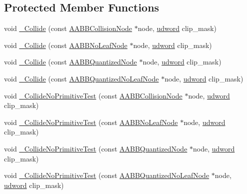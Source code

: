 \subsection*{Protected Member Functions}
\begin{DoxyCompactItemize}
\item 
void \hyperlink{class_planes_collider_afe02fe2d147e793bbeab7a9eb89bed2b}{\+\_\+\+Collide} (const \hyperlink{class_a_a_b_b_collision_node}{A\+A\+B\+B\+Collision\+Node} $\ast$node, \hyperlink{_ice_types_8h_a44c6f1920ba5551225fb534f9d1a1733}{udword} clip\+\_\+mask)
\item 
void \hyperlink{class_planes_collider_a2fe298e87efaba35deff6e4ad7a56da0}{\+\_\+\+Collide} (const \hyperlink{class_a_a_b_b_no_leaf_node}{A\+A\+B\+B\+No\+Leaf\+Node} $\ast$node, \hyperlink{_ice_types_8h_a44c6f1920ba5551225fb534f9d1a1733}{udword} clip\+\_\+mask)
\item 
void \hyperlink{class_planes_collider_a405bf739ddac7a191edee9a8e438bc8a}{\+\_\+\+Collide} (const \hyperlink{class_a_a_b_b_quantized_node}{A\+A\+B\+B\+Quantized\+Node} $\ast$node, \hyperlink{_ice_types_8h_a44c6f1920ba5551225fb534f9d1a1733}{udword} clip\+\_\+mask)
\item 
void \hyperlink{class_planes_collider_aface806a10833333a7e0473d7b30767b}{\+\_\+\+Collide} (const \hyperlink{class_a_a_b_b_quantized_no_leaf_node}{A\+A\+B\+B\+Quantized\+No\+Leaf\+Node} $\ast$node, \hyperlink{_ice_types_8h_a44c6f1920ba5551225fb534f9d1a1733}{udword} clip\+\_\+mask)
\item 
void \hyperlink{class_planes_collider_ac449d61fe5762a288103ec40c8bf72ce}{\+\_\+\+Collide\+No\+Primitive\+Test} (const \hyperlink{class_a_a_b_b_collision_node}{A\+A\+B\+B\+Collision\+Node} $\ast$node, \hyperlink{_ice_types_8h_a44c6f1920ba5551225fb534f9d1a1733}{udword} clip\+\_\+mask)
\item 
void \hyperlink{class_planes_collider_a63ae4b22dbfe779be74ca3bd60dd512a}{\+\_\+\+Collide\+No\+Primitive\+Test} (const \hyperlink{class_a_a_b_b_no_leaf_node}{A\+A\+B\+B\+No\+Leaf\+Node} $\ast$node, \hyperlink{_ice_types_8h_a44c6f1920ba5551225fb534f9d1a1733}{udword} clip\+\_\+mask)
\item 
void \hyperlink{class_planes_collider_a2c3e44827c703c4e97e224533c0b030c}{\+\_\+\+Collide\+No\+Primitive\+Test} (const \hyperlink{class_a_a_b_b_quantized_node}{A\+A\+B\+B\+Quantized\+Node} $\ast$node, \hyperlink{_ice_types_8h_a44c6f1920ba5551225fb534f9d1a1733}{udword} clip\+\_\+mask)
\item 
void \hyperlink{class_planes_collider_a3b4960caf24415388d68e458225bf4db}{\+\_\+\+Collide\+No\+Primitive\+Test} (const \hyperlink{class_a_a_b_b_quantized_no_leaf_node}{A\+A\+B\+B\+Quantized\+No\+Leaf\+Node} $\ast$node, \hyperlink{_ice_types_8h_a44c6f1920ba5551225fb534f9d1a1733}{udword} clip\+\_\+mask)

\end{DoxyCompactItemize}
